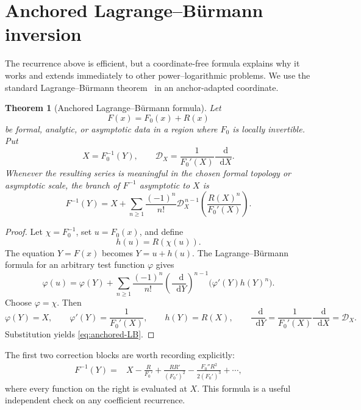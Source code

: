\documentclass[11pt,oneside]{article}
\theoremstyle{plain}
\newtheorem{theorem}{Theorem}[section]
\theoremstyle{definition}
\theoremstyle{remark}
\newcommand{\dd}{\mathop{}\!\mathrm{d}}
\newcommand{\calD}{\mathcal{D}}
\begin{document}
\section{Anchored Lagrange--B\"urmann inversion}
\label{sec:anchored-LB}

The recurrence above is efficient, but a coordinate-free formula explains why
it works and extends immediately to other power--logarithmic problems.  We use
the standard Lagrange--B\"urmann theorem~\cite{Henrici1974,FlajoletSedgewick2009}
in an anchor-adapted coordinate.

\begin{theorem}[Anchored Lagrange--B\"urmann formula]
\label{thm:anchored-LB}
Let
\begin{equation}
 F(x)=F_0(x)+R(x)
 \label{eq:F-split}
\end{equation}
be formal, analytic, or asymptotic data in a region where \(F_0\) is locally
invertible.  Put
\begin{equation}
 X=F_0^{-1}(Y),
 \qquad
 \calD_X=\frac1{F_0'(X)}\frac{\dd}{\dd X}.
 \label{eq:anchored-D}
\end{equation}
Whenever the resulting series is meaningful in the chosen formal topology or
asymptotic scale, the branch of \(F^{-1}\) asymptotic to \(X\) is
\begin{equation}
 \boxed{
 F^{-1}(Y)=X+
 \sum_{n\ge1}\frac{(-1)^n}{n!}\calD_X^{\,n-1}
 \left(\frac{R(X)^n}{F_0'(X)}\right).}
 \label{eq:anchored-LB}
\end{equation}
\end{theorem}

\begin{proof}
Let \(\chi=F_0^{-1}\), set \(u=F_0(x)\), and define
\[
 h(u)=R(\chi(u)).
\]
The equation \(Y=F(x)\) becomes \(Y=u+h(u)\).  The
Lagrange--B\"urmann formula for an arbitrary test function \(\varphi\) gives
\[
 \varphi(u)=\varphi(Y)+\sum_{n\ge1}\frac{(-1)^n}{n!}
 \left(\frac{\dd}{\dd Y}\right)^{n-1}
 \bigl(\varphi'(Y)h(Y)^n\bigr).
\]
Choose \(\varphi=\chi\).  Then
\[
 \varphi(Y)=X,
 \qquad
 \varphi'(Y)=\frac1{F_0'(X)},
 \qquad
 h(Y)=R(X),
 \qquad
 \frac{\dd}{\dd Y}=\frac1{F_0'(X)}\frac{\dd}{\dd X}=\calD_X.
\]
Substitution yields \eqref{eq:anchored-LB}.
\end{proof}

The first two correction blocks are worth recording explicitly:
\begin{align}
 F^{-1}(Y)={}&X-\frac{R}{F_0'}
 +\frac{RR'}{(F_0')^2}
 -\frac{F_0''R^2}{2(F_0')^3}+\cdots,
 \label{eq:anchored-first-two}
\end{align}
where every function on the right is evaluated at \(X\).  This formula is a
useful independent check on any coefficient recurrence.
\end{document}
